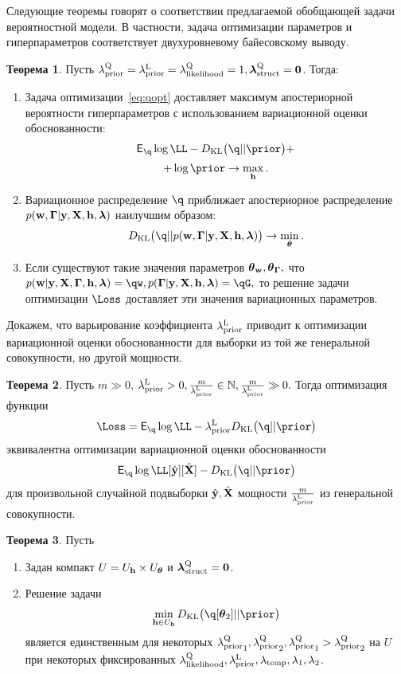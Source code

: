 \documentclass[11pt, a5paper]{dissert}
\theoremstyle{definition}
\newtheorem{theorem}{Теорема}
\begin{document}
{Следующие теоремы говорят о соответствии предлагаемой обобщающей задачи вероятностной модели. В частности, задача оптимизации параметров и гиперпараметров соответствует двухуровневому байесовскому выводу.
~\\
\begin{theorem}
Пусть ${\lambda_\text{prior}^\text{Q}} = \lambda_\text{prior}^\text{L}=\lambda_\text{likelihood}^\text{Q} = 1, \boldsymbol{\lambda}_\text{struct}^\text{Q}=\mathbf{0}$. Тогда:
\vspace{0.1cm}
\begin{enumerate}
\item Задача оптимизации~\eqref{eq:qopt} доставляет максимум апостериорной вероятности гиперпараметров с использованием вариационной оценки обоснованности:
\[
    \E_{\q}\log \LL - \KL{\q}{\prior} +
\]
\[
+ \log \prior \to \max_{\h}.
\]
\item Вариационное распределение $\q$ приближает апостериорное распределение $p(\mathbf{w}, \boldsymbol{\Gamma}|\mathbf{y}, \mathbf{X}, \mathbf{h},\boldsymbol{\lambda})$ наилучшим образом:
\[
    \KL{\q}{\post} \to \min_{\teta}.
\]


\item Если существуют такие значения параметров $\boldsymbol{\theta}_\mathbf{w}, \boldsymbol{\theta}_{\boldsymbol{\Gamma}},$ что $\postw = \qw, \postG = \qG,$
то решение задачи оптимизации $\Loss$ доставляет эти значения вариационных параметров.  
\end{enumerate}
\end{theorem}

Докажем, что варьирование коэффициента $\lambda_\text{prior}^\text{L}$ приводит к оптимизации вариационной оценки обоснованности для выборки из той же генеральной совокупности, но другой мощности.
\vspace{0.1cm}
\begin{theorem}
\label{th:elbo_size}
Пусть $m \gg 0$, $\lambda_\text{prior}^\text{L} > 0, \frac{m}{\lambda_\text{prior}^\text{L}}   \in \mathbb{N}, \frac{m}{\lambda_\text{prior}^\text{L}}  \gg 0.$ Тогда оптимизация функции
\[
\Loss = \E_{\q} \log \LL - \lamCL\KL{\q}{\prior}
\]
 эквивалентна оптимизации вариационной оценки обоснованности  $$\E_{\q} \log \LL[\hat{\y}][\hat{\X}] - \KL{\q}{\prior}$$
для произвольной случайной подвыборки $\hat{\mathbf{y}}, \hat{\mathbf{X}}$ мощности $\frac{m}{{\lambda_\text{prior}^\text{L}}}$ из генеральной совокупности.
\end{theorem}


\begin{theorem}
Пусть
\begin{enumerate}
\item Задан компакт $U = U_{\mathbf{h}} \times U_{\boldsymbol{\theta}}$ и  $\boldsymbol{\lambda}_\text{struct}^\text{Q}=\mathbf{0}$. 
\item Решение задачи
\begin{equation}
\label{eq:cp_theorem_kl}
\min_{\h \in \Uh} \KL{\q[\teta_2]}{\prior}
\end{equation}
 является единственным для некоторых ${\lambda_\text{prior}^\text{Q}}_1, {\lambda_\text{prior}^\text{Q}}_2, {\lambda_\text{prior}^\text{Q}}_1 > {\lambda_\text{prior}^\text{Q}}_2$ на $U$ при некоторых фиксированных $\lambda_\text{likelihood}^\text{Q}, \lambda_\text{prior}^\text{L}, \lambda_{\text{temp}}, \lambda_1, \lambda_2$.


\end{enumerate}
\end{theorem}}
\end{document}
